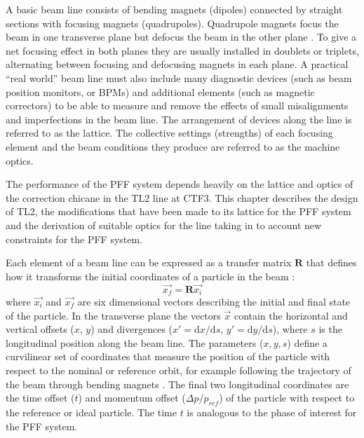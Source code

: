 
A basic beam line consists of bending magnets (dipoles) connected by straight sections with focusing magnets (quadrupoles). Quadrupole magnets focus the beam in one transverse plane but defocus the beam in the other plane \cite{wilson}. To give a net focusing effect in both planes they are usually installed in doublets or triplets, alternating between focusing and defocusing magnets in each plane.
A practical ``real world'' beam line must also include many diagnostic devices (such as beam position monitors, or BPMs) and additional elements (such as magnetic correctors) to be able to measure and remove the effects of small misalignments and imperfections in the beam line. The arrangement of devices along the line is referred to as the lattice. The collective settings (strengths) of each focusing element and the beam conditions they produce are referred to as the machine optics. 

The performance of the PFF system depends heavily on the lattice and optics of the correction chicane in the TL2 line at CTF3. This chapter describes the design of TL2, the modifications that have been made to its lattice for the PFF system and the derivation of suitable optics for the line taking in to account new constraints for the PFF system.


Each element of a beam line can be expressed as a transfer matrix \(\mathbf{R}\) that defines how it transforms the initial coordinates of a particle in the beam \cite{wilson}:
\begin{equation}
\vec{x_f} = \mathbf{R}\vec{x_i}
\label{e:basicTransMatEq}
\end{equation}
where \(\vec{x_i}\) and \(\vec{x_f}\) are six dimensional vectors describing the initial and final state of the particle. In the transverse plane the vectors \(\vec{x}\) contain the horizontal and vertical offsets (\(x\), \(y\)) and divergences (\(x' = \mathrm{d}x/\mathrm{d}s\), \(y' = \mathrm{d}y/\mathrm{d}s\)), where \(s\) is the longitudinal position along the beam line. The parameters (\(x, y, s\)) define a curvilinear set of coordinates that measure the position of the particle with respect to the nominal or reference orbit, for example following the trajectory of the beam through bending magnets \cite{wilson}. The final two longitudinal coordinates are the time offset (\(t\)) and momentum offset (\(\Delta p/p_{ref}\)) of the particle with respect to the reference or ideal particle. The time \(t\) is analogous to the phase of interest for the PFF system. 

